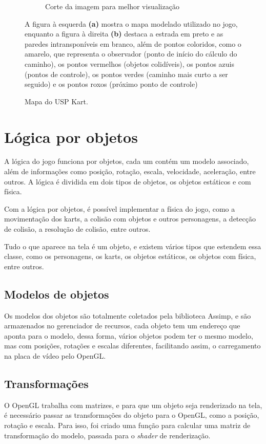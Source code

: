 \begin{figure}[H]
\begin{subfigure}[t]{0.45\textwidth}
        \caption{Corte da imagem para melhor visualização}
        \label{fig:mapa-modelado-com-pontos}
    \end{subfigure}
    \caption{Mapa do USP Kart.}
    \footnotesize{A figura à esquerda \textbf{(a)} mostra o mapa modelado utilizado no jogo, enquanto a figura à direita \textbf{(b)} destaca a estrada em preto e as paredes intransponíveis em branco, além de pontos coloridos, como o amarelo, que representa o observador (ponto de início do cálculo do caminho), os pontos vermelhos (objetos colidíveis), os pontos azuis (pontos de controle), os pontos verdes (caminho mais curto a ser seguido) e os pontos roxos (próximo ponto de controle)}
    \label{fig:mapa-usp-kart}
\end{figure}

\section{Lógica por objetos}

A lógica do jogo funciona por objetos, cada um contém um modelo associado, além de informações como posição, rotação, escala, velocidade, aceleração, entre outros. A lógica é dividida em dois tipos de objetos, os objetos estáticos e com física.

Com a lógica por objetos, é possível implementar a física do jogo, como a movimentação dos karts, a colisão com objetos e outros personagens, a detecção de colisão, a resolução de colisão, entre outros.

Tudo o que aparece na tela é um objeto, e existem vários tipos que estendem essa classe, como os personagens, os karts, os objetos estáticos, os objetos com física, entre outros.

\subsection{Modelos de objetos}

Os modelos dos objetos são totalmente coletados pela biblioteca Assimp, e são armazenados no gerenciador de recursos, cada objeto tem um endereço que aponta para o modelo, dessa forma, vários objetos podem ter o mesmo modelo, mas com posições, rotações e escalas diferentes, facilitando assim, o carregamento na placa de vídeo pelo OpenGL.
\subsection{Transformações}

O OpenGL trabalha com matrizes, e para que um objeto seja renderizado na tela, é necessário passar as transformações do objeto para o OpenGL, como a posição, rotação e escala. Para isso, foi criado uma função para calcular uma matriz de transformação do modelo, passada para o \textit{shader} de renderização.

